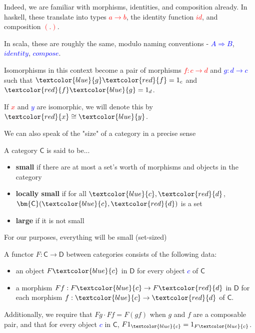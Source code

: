 \documentclass[tikz]{beamer}
\newcommand{\cat}[1]{\bm{ \mathsf{#1} }}
\newcommand{\cc}{\cat{C}}
\newcommand{\dd}{\cat{D}}
\newcommand{\red}[1]{\textcolor{red}{#1}}
\newcommand{\mred}[1]{\textcolor{red}{$#1$}}
\newcommand{\blue}[1]{\textcolor{blue}{#1}}
\newcommand{\mblue}[1]{\textcolor{blue}{$#1$}}
\theoremstyle{definition}
\begin{document}
\frame
{

	Indeed, we are familiar with morphisms, identities, and composition already. In haskell, these translate into types \mred{a \to b}, the identity function \mred{id}, and composition \mred{(.)}. 
	
	In scala, these are roughly the same, modulo naming conventions - \mblue{A \Rightarrow B}, \mblue{identity}, \mblue{compose}.  
}

\frame
{ 
	Isomorphisms in this context become a pair of morphisms \mred{ f : c \to d} and \mblue{g : d \to c} such that $\blue{g}\red{f} = 1_c$ and $\red{f}\blue{g} = 1_d$.
	
	 If \mred{x} and \mblue{y} are isomorphic, we will denote this by $\red{x} \cong \blue{y}$.
}

\frame
{
	We can also speak of the "size" of a category in a precise sense
}

\frame
{
	\begin{definition}
		A category $\cc$ is said to be...
		\begin{itemize}
			\item \textbf{small} if there are at most a set's worth of morphisms and objects in the category
			\item \textbf{locally small} if for all $\blue{c}, \red{d}$, $\cc(\blue{c}, \red{d})$ is a set
			\item \textbf{large} if it is not small
		\end{itemize}
	\end{definition}
}

\frame
{
	For our purposes, everything will be small (set-sized)
}

\frame
{
	
	\begin{definition}[Functor]
		A functor $F : \cc \to \dd$ between categories consists of the following data: 
		
		\begin{itemize}
			\item an object $F\blue{c}$ in $\dd$ for every object \mblue{c} of $\cc$
			\item a morphism $Ff : F\blue{c} \to F\red{d}$ in $\dd$ for each morphism $f : \blue{c} \to \red{d}$ of $\cc$.
		\end{itemize}
		
		Additionally, we require that $Fg \cdot Ff = F(gf)$ when $g$ and $f$ are a composable pair, and that for every object \mblue{c} in $\cc$, $F1_{\blue{c}} = 1_{F\blue{c}}$.
	\end{definition}
}
\end{document}

